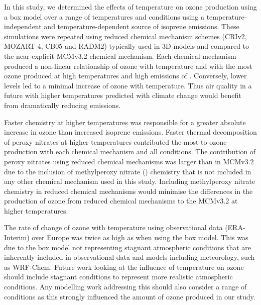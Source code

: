 In this study, we determined the effects of temperature on ozone production using a box model over a range of temperatures and  conditions using a temperature-independent and temperature-dependent source of isoprene emissions.
These simulations were repeated using reduced chemical mechanism schemes (CRIv2, MOZART-4, CB05 and RADM2) typically used in 3D models and compared to the near-explicit MCMv3.2 chemical mechanism.
Each chemical mechanism produced a non-linear relationship of ozone with temperature and  with the most ozone produced at high temperatures and high emissions of .
Conversely, lower  levels led to a minimal increase of ozone with temperature.
Thus air quality in a future with higher temperatures predicted with climate change would benefit from dramatically reducing  emissions.

Faster chemistry at higher temperatures was responsible for a greater absolute increase in ozone than increased isoprene emissions.
Faster thermal decomposition of peroxy nitrates at higher temperatures contributed the most to ozone production with each chemical mechanism and all  conditions.
The contribution of peroxy nitrates using reduced chemical mechanisms was larger than in MCMv3.2 due to the inclusion of methylperoxy nitrate () chemistry that is not included in any other chemical mechanism used in this study.
Including methylperoxy nitrate chemistry in reduced chemical mechanisms would minimise the differences in the production of ozone from reduced chemical mechanisms to the MCMv3.2 at higher temperatures.

The rate of change of ozone with temperature using observational data (ERA-Interim) over Europe was twice as high as when using the box model.
This was due to the box model not representing stagnant atmospheric conditions that are inherently included in observational data and models including meteorology, such as WRF-Chem.
Future work looking at the influence of temperature on ozone should include stagnant conditions to represent more realistic atmospheric conditions.
Any modelling work addressing this should also consider a range of  conditions as this strongly influenced the amount of ozone produced in our study.
